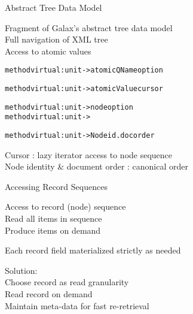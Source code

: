 \documentclass[landscape]{slides}
\begin{document}
\begin{Slide}{Abstract Tree Data Model}

\vspace*{1cm}
\bb Fragment of Galax's abstract tree data model\\
\bbb Full navigation of XML tree\\
\bbb Access to atomic values

{\small
\begin{alltt}
  method virtual     : unit -> atomicQName option

  method virtual   : unit -> atomicValue cursor

  method virtual        : unit -> node option
  method virtual      : unit -> 

  method virtual   : unit -> Nodeid.docorder
\end{alltt}}

\bb Cursor : lazy iterator access to node sequence\\
\bb Node identity \& document order : canonical order 

\end{Slide}

\begin{Slide}{Accessing Record Sequences}

  \bb Access to record (node) sequence \\
  \bbb Read all items in sequence \\
  \bbb Produce items on demand

  \bb Each record field materialized strictly as needed

  \bb Solution: \\
  \bbb Choose record as read granularity \\
  \bbb Read record on demand \\
  \bbb Maintain meta-data for fast re-retrieval
\end{Slide}

\end{document}
